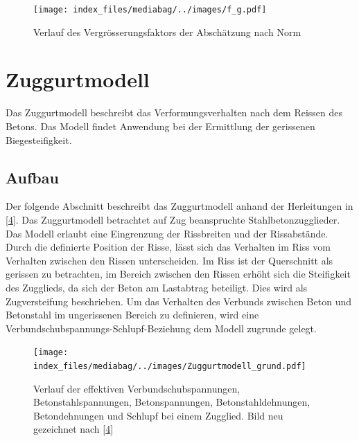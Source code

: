 \documentclass[
  12pt,
  letterpaper,
  egregdoesnotlikesansseriftitles]{scrreprt}
\begin{document}
\begin{figure}[H]

{\centering \texttt{[image: index\_files/mediabag/../images/f\_g.pdf]}

}

\caption{\label{fig-fg}Verlauf des Vergrösserungsfaktors der Abschätzung
nach Norm}

\end{figure}

\hypertarget{sec-zuggurtmodell}{%
\section{Zuggurtmodell}\label{sec-zuggurtmodell}}

Das Zuggurtmodell beschreibt das Verformungsverhalten nach dem Reissen
des Betons. Das Modell findet Anwendung bei der Ermittlung der
gerissenen Biegesteifigkeit.

\hypertarget{aufbau-2}{%
\subsection{Aufbau}\label{aufbau-2}}

Der folgende Abschnitt beschreibt das Zuggurtmodell anhand der
Herleitungen in {[}\protect\hyperlink{ref-Spathelf2022}{4}{]}. Das
Zuggurtmodell betrachtet auf Zug beanspruchte Stahlbetonzugglieder. Das
Modell erlaubt eine Eingrenzung der Rissbreiten und der Rissabstände.
Durch die definierte Position der Risse, lässt sich das Verhalten im
Riss vom Verhalten zwischen den Rissen unterscheiden. Im Riss ist der
Querschnitt als gerissen zu betrachten, im Bereich zwischen den Rissen
erhöht sich die Steifigkeit des Zugglieds, da sich der Beton am
Lastabtrag beteiligt. Dies wird als Zugversteifung beschrieben. Um das
Verhalten des Verbunds zwischen Beton und Betonstahl im ungerissenen
Bereich zu definieren, wird eine Verbundschubspannungs-Schlupf-Beziehung
dem Modell zugrunde gelegt.

\begin{figure}[H]

{\centering \texttt{[image: index\_files/mediabag/../images/Zuggurtmodell\_grund.pdf]}

}

\caption{\label{fig-zuggurtmodell}Verlauf der effektiven
Verbundschubspannungen, Betonstahlspannungen, Betonspannungen,
Betonstahldehnungen, Betondehnungen und Schlupf bei einem Zugglied. Bild
neu gezeichnet nach {[}\protect\hyperlink{ref-Spathelf2022}{4}{]}}

\end{figure}
\end{document}
